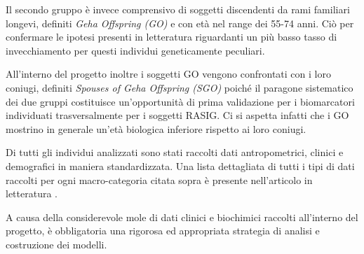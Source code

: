 \documentclass[12pt,openright,twoside,a4paper]{book}
\begin{document}
Il secondo gruppo è invece comprensivo di soggetti discendenti da rami familiari longevi, definiti \textit{Geha Offspring (GO)} e con età nel range dei 55-74 anni.
Ciò per confermare le ipotesi presenti in letteratura riguardanti un più basso tasso di invecchiamento per questi individui geneticamente peculiari.

All'interno del progetto inoltre i soggetti GO vengono confrontati con i loro coniugi, definiti \textit{Spouses of Geha Offspring (SGO) } poiché il paragone sistematico dei due gruppi costituisce un'opportunità di prima validazione per i biomarcatori individuati trasversalmente per i soggetti RASIG.
Ci si aspetta infatti che i GO mostrino in generale un'età biologica inferiore rispetto ai loro coniugi.

Di tutti gli individui analizzati sono stati raccolti dati antropometrici, clinici e demografici in maniera standardizzata.
Una lista dettagliata di tutti i tipi di dati raccolti per ogni macro-categoria citata sopra è presente nell'articolo in letteratura \cite{markage}.

A causa della considerevole mole di dati clinici e biochimici  raccolti all'interno del progetto, è obbligatoria una rigorosa ed appropriata strategia di analisi e costruzione dei modelli.
\end{document}
